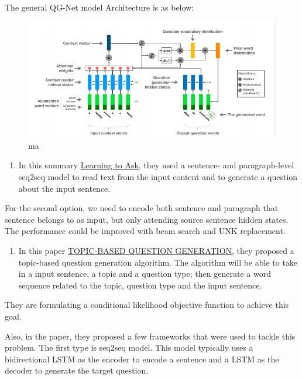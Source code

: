 \documentclass{acm_proc_article-sp}
\providecommand{\tightlist}{%
  \setlength{\itemsep}{0pt}\setlength{\parskip}{0pt}}
\begin{document}
The general QG-Net model Architecture is as below:

\begin{figure}
\centering
\includegraphics{img/qgnet.png}
\caption{ma}
\end{figure}

\begin{enumerate}
\def\labelenumi{\arabic{enumi}.}
\setcounter{enumi}{1}
\tightlist
\item
  In this summary
  \href{http://www.cs.cornell.edu/~xdu/papers/acl17_dsc_poster.pdf}{Learning
  to Ask}, they used a sentence- and paragraph-level seq2seq model to
  read text from the input content and to generate a question about the
  input sentence.
\end{enumerate}

For the second option, we need to encode both sentence and paragraph
that sentence belongs to as input, but only attending source sentence
hidden states. The performance could be improved with beam search and
UNK replacement.

\begin{enumerate}
\def\labelenumi{\arabic{enumi}.}
\setcounter{enumi}{2}
\tightlist
\item
  In this paper
  \href{https://openreview.net/pdf?id=rk3pnae0b}{TOPIC-BASED QUESTION
  GENERATION}, they proposed a topic-based question generation
  algorithm. The algorithm will be able to take in a input sentence, a
  topic and a question type; then generate a word sequence related to
  the topic, question type and the input sentence.
\end{enumerate}

They are formulating a conditional likelihood objective function to
achieve this goal.

Also, in the paper, they proposed a few frameworks that were used to
tackle this problem. The first type is seq2seq model. This model
typically uses a bidirectional LSTM as the encoder to encode a sentence
and a LSTM as the decoder to generate the target question.
\end{document}
